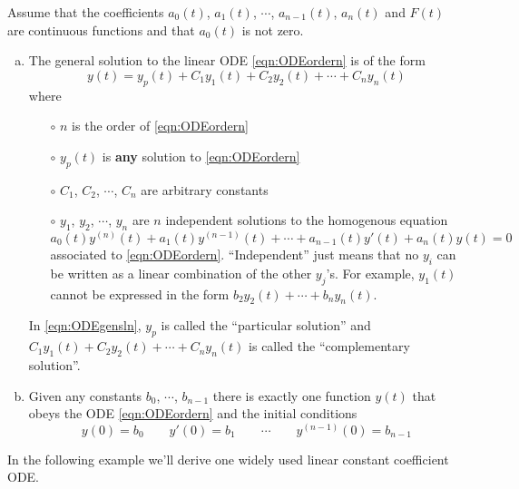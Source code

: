 \begin{theorem}\label{thm:odeMain}
Assume that the coefficients $a_0(t)$, $a_1(t)$, $\cdots$, $a_{n-1}(t)$, 
$a_n(t)$ and $F(t)$ are continuous functions and that 
$a_0(t)$ is not zero.

\begin{enumerate}[(a)]
\item %
The general solution to the linear ODE \eqref{eqn:ODEordern} is of the form
\begin{equation}\label{eqn:ODEgensln}
y(t)=y_p(t)+ C_1y_1(t)+C_2y_2(t)+\cdots+C_n y_n(t)
\end{equation}
where 
\begin{itemize}\itemsep1pt \parskip0pt  %
\item[$\circ$] $n$ is the order of \eqref{eqn:ODEordern}
\item[$\circ$] $y_p(t)$ is \textbf{any} solution to \eqref{eqn:ODEordern}
\item[$\circ$] $C_1$, $C_2$, $\cdots$, $C_n$ are arbitrary constants
\item[$\circ$] $y_1$, $y_2$, $\cdots$, $y_n$ are $n$ independent solutions
to the homogenous equation 
\begin{equation*}
a_0(t) y^{(n)}(t) + a_1(t) y^{(n-1)}(t)+\cdots+a_{n-1}(t) y'(t) +a_n(t)y(t)=0
\end{equation*}
associated to \eqref{eqn:ODEordern}.
``Independent'' just means that no $y_i$ can be written as a linear combination
of the other $y_j$'s. For example, $y_1(t)$ cannot be expressed in the form
$b_2y_2(t)+\cdots+b_ny_n(t)$. 
\end{itemize}
In \eqref{eqn:ODEgensln}, $y_p$ is called the ``particular solution'' and 
$C_1y_1(t)+C_2y_2(t)+\cdots+C_n y_n(t)$ is called the 
``complementary solution''.

\item %
Given any constants $b_0$, $\cdots$, $b_{n-1}$ there is exactly
one function $y(t)$ that obeys the ODE \eqref{eqn:ODEordern} and the initial
conditions
\begin{equation*}
y(0)=b_0\qquad y'(0)=b_1\qquad \cdots\qquad y^{(n-1)}(0)=b_{n-1}
\end{equation*}
\end{enumerate}
\end{theorem}


In the following example we'll derive one widely used linear constant coefficient ODE.


